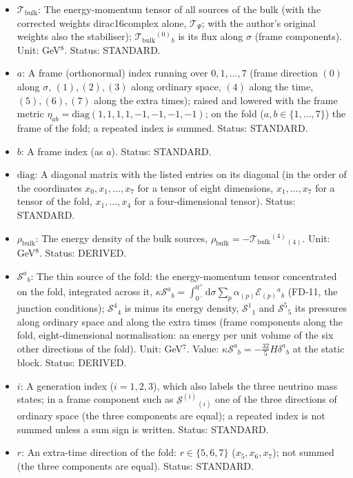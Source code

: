 \documentclass[
  10pt,
]{article}
\begin{document}
\begin{itemize}
  \(\kappa = 8\pi G_8\). Unit: GeV\(^{-6}\). Status: AUTHOR.
\item
  \(\mathcal{T}_{\mathrm{bulk}}\): The energy-momentum tensor of all
  sources of the bulk (with the corrected weights dirac16complex alone,
  \(\mathcal{T}_\Psi\); with the author's original weights also the
  stabiliser); \(\mathcal{T}_{\mathrm{bulk}}{}^{(0)}{}_b\) is its flux
  along \(\sigma\) (frame components). Unit: GeV\(^8\). Status:
  STANDARD.
\item
  \(a\): A frame (orthonormal) index running over \(0, 1, \dots, 7\)
  (frame direction \((0)\) along \(\sigma\), \((1), (2), (3)\) along
  ordinary space, \((4)\) along the time, \((5), (6), (7)\) along the
  extra times); raised and lowered with the frame metric
  \(\eta_{ab} = \mathrm{diag}(1, 1, 1, 1, -1, -1, -1, -1)\); on the fold
  (\(a, b \in \{1, \dots, 7\}\)) the frame of the fold; a repeated index
  is summed. Status: STANDARD.
\item
  \(b\): A frame index (as \(a\)). Status: STANDARD.
\item
  \(\mathrm{diag}\): A diagonal matrix with the listed entries on its
  diagonal (in the order of the coordinates \(x_0, x_1, \dots, x_7\) for
  a tensor of eight dimensions, \(x_1, \dots, x_7\) for a tensor of the
  fold, \(x_1, \dots, x_4\) for a four-dimensional tensor). Status:
  STANDARD.
\item
  \(\rho_{\mathrm{bulk}}\): The energy density of the bulk sources,
  \(\rho_{\mathrm{bulk}} = -\mathcal{T}_{\mathrm{bulk}}{}^{(4)}{}_{(4)}\).
  Unit: GeV\(^8\). Status: DERIVED.
\item
  \(\mathcal{S}^a{}_b\): The thin source of the fold: the
  energy-momentum tensor concentrated on the fold, integrated across it,
  \(\kappa\mathcal{S}^a{}_b = \int_{0^-}^{0^+}\mathrm{d}\sigma\sum_p\alpha_{(p)}\mathcal{E}_{(p)}{}^a{}_b\)
  (FD-11, the junction conditions); \(\mathcal{S}^4{}_4\) is minus its
  energy density, \(\mathcal{S}^1{}_1\) and \(\mathcal{S}^5{}_5\) its
  pressures along ordinary space and along the extra times (frame
  components along the fold, eight-dimensional normalisation: an energy
  per unit volume of the six other directions of the fold). Unit:
  GeV\(^7\). Value:
  \(\kappa\mathcal{S}^a{}_b = -\frac{32}{5}H\delta^a{}_b\) at the static
  block. Status: DERIVED.
\item
  \(i\): A generation index (\(i = 1, 2, 3\)), which also labels the
  three neutrino mass states; in a frame component such as
  \(\mathcal{S}^{(i)}{}_{(i)}\) one of the three directions of ordinary
  space (the three components are equal); a repeated index is not summed
  unless a sum sign is written. Status: STANDARD.
\item
  \(r\): An extra-time direction of the fold: \(r \in \{5, 6, 7\}\)
  (\(x_5, x_6, x_7\)); not summed (the three components are equal).
  Status: STANDARD.
\end{itemize}
\end{document}
